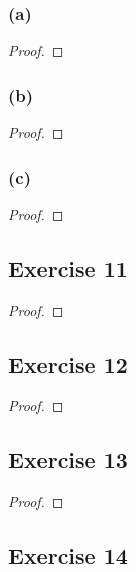 \documentclass[14pt]{extarticle}
\begin{document}
\subsubsection{(a)}

\begin{proof}

\end{proof}

\subsubsection{(b)}

\begin{proof}

\end{proof}

\subsubsection{(c)}

\begin{proof}

\end{proof}

\subsection{Exercise 11}

\begin{proof}

\end{proof}

\subsection{Exercise 12}

\begin{proof}

\end{proof}

\subsection{Exercise 13}

\begin{proof}

\end{proof}

\subsection{Exercise 14}
\end{document}
